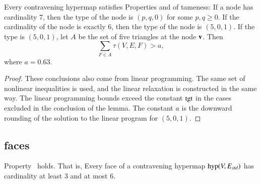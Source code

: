 \begin{lemma}\label{lemma:degE}
Every contravening hypermap satisfies Properties  and 
of tameness: 
If a node has cardinality $7$, then the type of the
       node is $(p,q,0)$ for some $p,q\ge0$.   If the
        cardinality of the node is exactly $6$, then the type of the node
        is $(5,0,1)$.
If the type is $(5,0,1)$, let $A$ be the set of five triangles at the
node ${\mathbf v}$.  Then
%
%
$$
\sum_{F\in A} \tau(V,E,F) > a,
$$
where $a=0.63$.
\end{lemma}



\begin{proof} These conclusions also come from linear programming.
The same set of nonlinear inequalities is used, and the linear
relaxation is constructed in the same way.  The linear programming
bounds exceed the constant ${\operatorname{tgt}}$ in the cases excluded in the conclusion
of the lemma.  The constant $a$ is the downward rounding of the solution to the linear program for $(5,0,1)$.
\end{proof}
%

%

\subsection{faces}



\begin{lemma}  \label{lemma:face-size}
Property~ holds.  That is,
Every face of a contravening hypermap ${\operatorname{hyp}}(V,E_{std})$ has cardinality at least $3$ and at most $6$.
\end{lemma}


